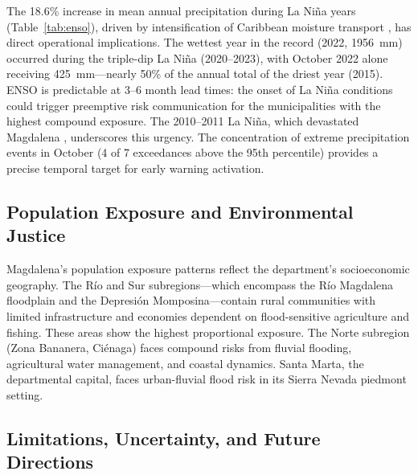 \documentclass{article}
\begin{document}
The 18.6\% increase in mean annual precipitation during La Ni\~na years (Table~\ref{tab:enso}), driven by intensification of Caribbean moisture transport \citep{Poveda2001, Poveda2011}, has direct operational implications. The wettest year in the record (2022, \SI{1956}{\milli\metre}) occurred during the triple-dip La Ni\~na (2020--2023), with October 2022 alone receiving \SI{425}{\milli\metre}---nearly 50\% of the annual total of the driest year (2015). ENSO is predictable at 3--6 month lead times: the onset of La Ni\~na conditions could trigger preemptive risk communication for the municipalities with the highest compound exposure. The 2010--2011 La Ni\~na, which devastated Magdalena \citep{Hoyos2013, UNGRD2012}, underscores this urgency. The concentration of extreme precipitation events in October (4 of 7 exceedances above the 95th percentile) provides a precise temporal target for early warning activation.

\subsection{Population Exposure and Environmental Justice}

Magdalena's population exposure patterns reflect the department's socioeconomic geography. The R\'io and Sur subregions---which encompass the R\'io Magdalena floodplain and the Depresi\'on Momposina---contain rural communities with limited infrastructure and economies dependent on flood-sensitive agriculture and fishing. These areas show the highest proportional exposure. The Norte subregion (Zona Bananera, Ci\'enaga) faces compound risks from fluvial flooding, agricultural water management, and coastal dynamics. Santa Marta, the departmental capital, faces urban-fluvial flood risk in its Sierra Nevada piedmont setting.

\subsection{Limitations, Uncertainty, and Future Directions}
\label{sec:limitations}
\end{document}
